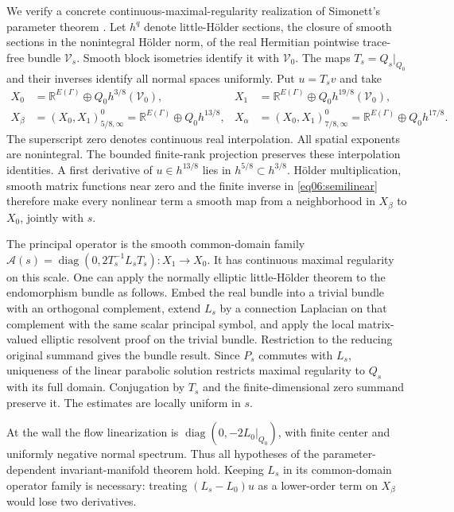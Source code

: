 \documentclass[11pt]{amsart}
\theoremstyle{definition}
\theoremstyle{remark}
\newcommand{\RR}{\mathbb R}
\newcommand{\diag}{\operatorname{diag}}
\begin{document}
We verify a concrete continuous-maximal-regularity realization of
Simonett's parameter theorem \cite[Theorem~2.1]{simonett1994}.
Let \(h^q\) denote little-Hölder sections, the closure of smooth
sections in the nonintegral Hölder norm, of the real Hermitian
pointwise trace-free bundle \(\mathcal V_s\). Smooth block
isometries identify it with \(\mathcal V_0\). The maps
\(T_s=Q_s|_{Q_0}\) and their inverses identify all normal spaces
uniformly. Put \(u=T_sv\) and take
\begin{equation}\label{eq06:spaces}
 \begin{aligned}
 X_0&=\RR^{E(\Gamma)}\oplus Q_0h^{3/8}(\mathcal V_0),&
 X_1&=\RR^{E(\Gamma)}\oplus Q_0h^{19/8}(\mathcal V_0),\\
 X_\beta&=(X_0,X_1)^0_{5/8,\infty}
       =\RR^{E(\Gamma)}\oplus Q_0h^{13/8},&
 X_\alpha&=(X_0,X_1)^0_{7/8,\infty}
       =\RR^{E(\Gamma)}\oplus Q_0h^{17/8}.
 \end{aligned}
\end{equation}
The superscript zero denotes continuous real interpolation. All
spatial exponents are nonintegral. The bounded finite-rank projection
preserves these interpolation identities. A first derivative of
\(u\in h^{13/8}\) lies in \(h^{5/8}\subset h^{3/8}\).
Hölder multiplication, smooth matrix functions near zero and the
finite inverse in \eqref{eq06:semilinear} therefore make every
nonlinear term a smooth map from a neighborhood in \(X_\beta\)
to \(X_0\), jointly with \(s\).

The principal operator is the smooth common-domain family
\(\mathcal A(s)=\diag(0,2T_s^{-1}L_sT_s):X_1\to X_0\).
It has continuous maximal regularity on this scale. One can apply
the normally elliptic little-Hölder theorem
\cite[Remark~3.3 and Proposition~3.7]{shaosimonett2014} to the
endomorphism bundle as follows. Embed the real bundle into a
trivial bundle with an orthogonal complement, extend \(L_s\) by
a connection Laplacian on that complement with the same scalar
principal symbol, and apply the local matrix-valued elliptic
resolvent proof on the trivial bundle. Restriction to the reducing
original summand gives the bundle result. Since \(P_s\) commutes
with \(L_s\), uniqueness of the linear parabolic solution restricts
maximal regularity to \(Q_s\) with its full domain. Conjugation
by \(T_s\) and the finite-dimensional zero summand preserve it.
The estimates are locally uniform in \(s\).

At the wall the flow linearization is
\(\diag(0,-2L_0|_{Q_0})\), with finite center and uniformly negative
normal spectrum. Thus all hypotheses of the parameter-dependent
invariant-manifold theorem hold. Keeping \(L_s\) in its
common-domain operator family is necessary: treating
\((L_s-L_0)u\) as a lower-order term on \(X_\beta\) would lose
two derivatives.
\end{document}
